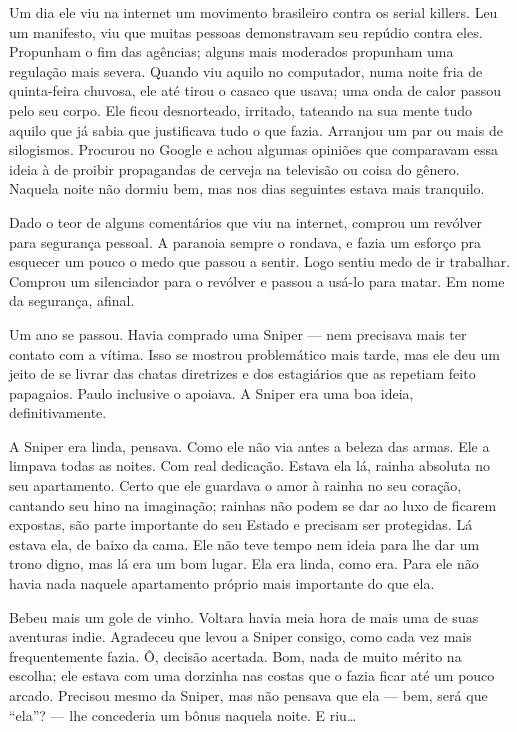 Um dia ele viu na internet um movimento brasileiro contra os \foreignlanguage{english}{serial killers}. Leu um manifesto, viu que muitas pessoas demonstravam seu repúdio contra eles. Propunham o fim das agências; alguns mais moderados propunham uma regulação mais severa. Quando viu aquilo no computador, numa noite fria de quinta-feira chuvosa, ele até tirou o casaco que usava; uma onda de calor passou pelo seu corpo. Ele ficou desnorteado, irritado, tateando na sua mente tudo aquilo que já sabia que justificava tudo o que fazia. Arranjou um par ou mais de silogismos. Procurou no Google e achou algumas opiniões que comparavam essa ideia à de proibir propagandas de cerveja na televisão ou coisa do gênero. Naquela noite não dormiu bem, mas nos dias seguintes estava mais tranquilo.

Dado o teor de alguns comentários que viu na internet, comprou um revólver para segurança pessoal. A paranoia sempre o rondava, e fazia um esforço pra esquecer um pouco o medo que passou a sentir. Logo sentiu medo de ir trabalhar. Comprou um silenciador para o revólver e passou a usá-lo para matar. Em nome da segurança, afinal.

Um ano se passou. Havia comprado uma Sniper --- nem precisava mais ter contato com a vítima. Isso se mostrou pro\-ble\-má\-ti\-co mais tarde, mas ele deu um jeito de se livrar das chatas diretrizes e dos estagiários que as repetiam feito papagaios. Paulo inclusive o apoiava. A Sniper era uma boa ideia, definitivamente.

A Sniper era linda, pensava. Como ele não via antes a beleza das armas. Ele a limpava todas as noites. Com real dedicação. Estava ela lá, rainha absoluta no seu apartamento. Certo que ele guardava o amor à rainha no seu coração, cantando seu hino na imaginação; rainhas não podem se dar ao luxo de ficarem expostas, são parte importante do seu Estado e precisam ser protegidas. Lá estava ela, de baixo da cama. Ele não teve tempo nem ideia para lhe dar um trono digno, mas lá era um bom lugar. Ela era linda, como era. Para ele não havia nada naquele apartamento próprio mais importante do que ela.

Bebeu mais um gole de vinho. Voltara havia meia hora de mais uma de suas aventuras indie. Agradeceu que levou a Sniper consigo, como cada vez mais frequentemente fazia. Ô, decisão acertada. Bom, nada de muito mérito na escolha; ele estava com uma dorzinha nas costas que o fazia ficar até um pouco arcado. Precisou mesmo da Sniper, mas não pensava que ela --- bem, será que ``ela''? --- lhe concederia um bônus naquela noite. E riu\ldots

